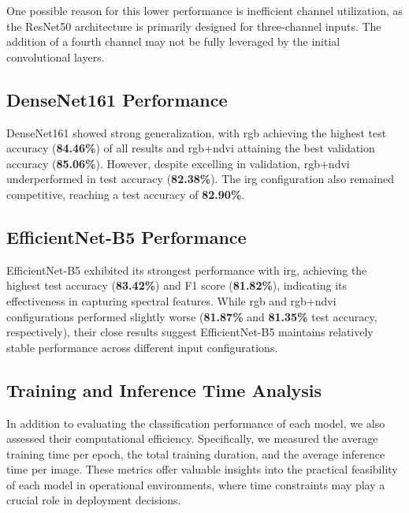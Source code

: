 One possible reason for this lower performance is inefficient channel utilization, 
as the ResNet50 architecture is primarily designed for three-channel inputs. The addition 
of a fourth channel may not be fully leveraged by the initial convolutional layers.

\subsection{DenseNet161 Performance}
DenseNet161 showed strong generalization, with \gls{rgb} achieving the highest test accuracy (\textbf{84.46\%}) of all results
and \gls{rgb}+\gls{ndvi} attaining the best validation accuracy (\textbf{85.06\%}). However, despite excelling in validation, 
\gls{rgb}+\gls{ndvi} underperformed in test accuracy (\textbf{82.38\%}). The \gls{irg} configuration also remained competitive, 
reaching a test accuracy of \textbf{82.90\%}.

\subsection{EfficientNet-B5 Performance}
EfficientNet-B5 exhibited its strongest performance with \gls{irg}, achieving the highest test accuracy (\textbf{83.42\%}) 
and F1 score (\textbf{81.82\%}), indicating its effectiveness in capturing spectral features. While \gls{rgb} and \gls{rgb}+\gls{ndvi} 
configurations performed slightly worse (\textbf{81.87\%} and \textbf{81.35\%} test accuracy, respectively), 
their close results suggest EfficientNet-B5 maintains relatively stable performance across different input configurations.

\subsection{Training and Inference Time Analysis}

In addition to evaluating the classification performance of each model, 
we also assessed their computational efficiency. Specifically, we 
measured the average training time per epoch, the total training duration, 
and the average inference time per image. These metrics offer valuable 
insights into the practical feasibility of each model in operational 
environments, where time constraints may play a crucial role in deployment 
decisions.

